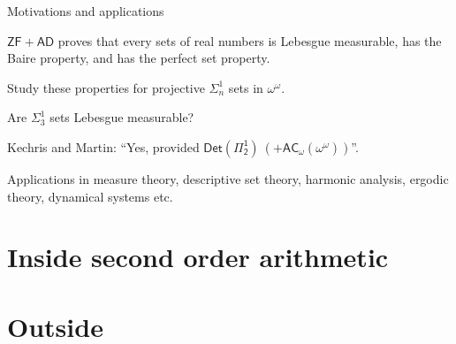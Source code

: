 \documentclass{beamer} %
\begin{document}

\begin{frame}{Motivations and applications}

    \begin{theorem}
        $\mathsf{ZF + AD}$ proves  that every sets of real numbers is Lebesgue measurable, has 
        the Baire property, and has the perfect set property.
    \end{theorem}

    Study these properties for projective $\Sigma^1_n$ sets in $\omega^{\omega}$. 

    \begin{center}
        Are $\Sigma^1_3$ sets Lebesgue measurable? 
        
        Kechris and Martin: ``Yes, provided $\mathsf{Det(\Pi^1_2)\ (+ AC_{\omega}(\omega^{\omega}))}$''.
    \end{center}

    Applications in measure theory, descriptive set theory, harmonic analysis, ergodic theory, 
    dynamical systems etc.


\end{frame}


\section{Inside second order arithmetic}

\begin{frame}{}
    
\end{frame}


\section{Outside}

\begin{frame}{}

\end{frame}

\end{document}
